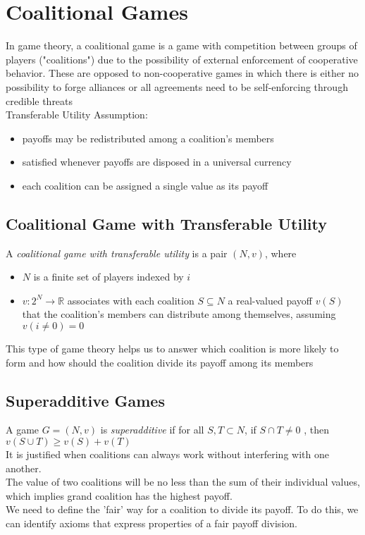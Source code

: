 \section{Coalitional Games}
In game theory, a coalitional game is a game with competition between groups of players ("coalitions") due to the possibility of external enforcement of cooperative behavior. These are opposed to non-cooperative games in which there is either no possibility to forge alliances or all agreements need to be self-enforcing through credible threats\\

Transferable Utility Assumption:
\begin{itemize}
\item payoffs may be redistributed among a coalition's members
\item satisfied whenever payoffs are disposed in a universal currency
\item each coalition can be assigned a single value as its payoff
\end{itemize}

\subsection{Coalitional Game with Transferable Utility}
A \textit{coalitional game with transferable utility} is a pair $(N, v)$, where 
\begin{itemize}
\item $N$ is a finite set of players indexed by $i$
\item $v : 2^N \to \mathbb{R}$ associates with each coalition $S \subseteq N$ a real-valued payoff $v(S)$ that the coalition's members can distribute among themselves, assuming $v(i\ne 0) = 0$ 
\end{itemize}

This type of game theory helps us to answer which coalition is more likely to form and how should the coalition divide its payoff among its members

\subsection{Superadditive Games}
A game $G = (N, v)$ is \textit{superadditive} if for all $S, T\subset N$, if $S \cap T \ne 0$ , then $v(S\cup T)\geq v(S) + v(T)$\\
\newline
It is justified when coalitions can always work without interfering with one another.\\ The value of two coalitions will be no less than the sum of their individual values, which implies grand coalition has the highest payoff.\\
We need to define the 'fair' way for a coalition to divide its payoff. To do this, we can identify axioms that express properties of a fair payoff division.

